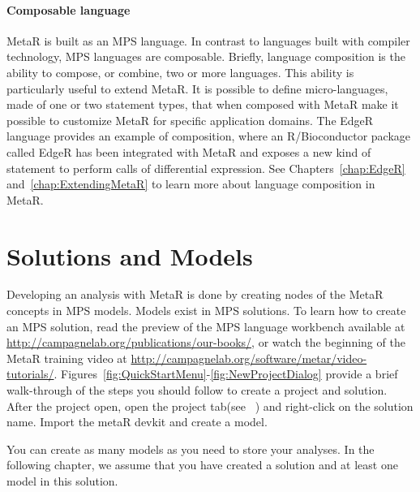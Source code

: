 \paragraph{Composable language}
MetaR is built as an MPS language. In contrast to languages built with compiler technology, MPS languages are composable. Briefly, language composition is the ability to compose, or combine, two or more languages. This ability is particularly useful to extend MetaR. It is possible to define micro-languages, made of one or two statement types, that when composed with MetaR make it possible to customize MetaR for specific application domains. The EdgeR language provides an example of composition, where an R/Bioconductor package called EdgeR has been integrated with MetaR and exposes a new kind of statement to perform calls of differential expression. See Chapters~\ref{chap:EdgeR} and~\ref{chap:ExtendingMetaR} to learn more about language composition  in MetaR.
  
\section{Solutions and Models}
Developing an analysis with MetaR is done by creating nodes of the MetaR concepts in MPS models. Models exist in MPS solutions. To learn how to create an MPS solution, read the preview of the MPS language workbench available at \url{http://campagnelab.org/publications/our-books/}\cite{campagne2014mps}, or watch the beginning of the MetaR training video at \url{http://campagnelab.org/software/metar/video-tutorials/}. Figures~\ref{fig:QuickStartMenu}-\ref{fig:NewProjectDialog} provide a brief walk-through of the steps you should follow to create a project and solution. After the project open, open the project tab(see ~\cite{campagne2014mps}) and right-click on the solution name. Import the metaR devkit and create a model. 

You can create as many models as you need to store your analyses. In the following chapter, we assume that you have created a solution and at least one model in this solution. 


